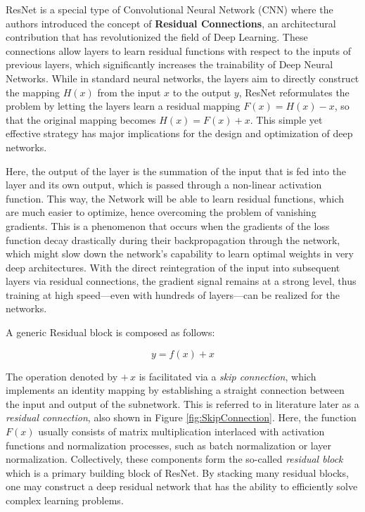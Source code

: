 ResNet \cite{ResNet} is a special type of Convolutional Neural Network (CNN) where the authors introduced the concept of \textbf{Residual Connections}, an architectural contribution that has revolutionized the field of Deep Learning. These connections allow layers to learn residual functions with respect to the inputs of previous layers, which significantly increases the trainability of Deep Neural Networks.
While in standard neural networks, the layers aim to directly construct the mapping $H(x)$ from the input $x$ to the output $y$, ResNet reformulates the problem by letting the layers learn a residual mapping $F(x) = H(x) - x$, so that the original mapping becomes $H(x) = F(x) + x$. This simple yet effective strategy has major implications for the design and optimization of deep networks.

Here, the output of the layer is the summation of the input that is fed into the layer and its own output, which is passed through a non-linear activation function. This way, the Network will be able to learn residual functions, which are much easier to optimize, hence overcoming the problem of vanishing gradients.
This is a phenomenon that occurs when the gradients of the loss function decay drastically during their backpropagation through the network, which might slow down the network's capability to learn optimal weights in very deep architectures. With the direct reintegration of the input into subsequent layers via residual connections, the gradient signal remains at a strong level, thus training at high speed—even with hundreds of layers—can be realized for the networks.

A generic Residual block is composed as follows:
\begin{center} 
    \[
        y = f(x) + x
    \]
\end{center}

The operation denoted by $+ \, x$ is facilitated via a \textit{skip connection}, which implements an identity mapping by establishing a straight connection between the input and output of the subnetwork. This is referred to in literature later as a \textit{residual connection}, also shown in Figure \ref{fig:SkipConnection}. Here, the function $F(x)$ usually consists of matrix multiplication interlaced with activation functions and normalization processes, such as batch normalization or layer normalization. Collectively, these components form the so-called \textit{residual block} which is a primary building block of ResNet. By stacking many residual blocks, one may construct a deep residual network that has the ability to efficiently solve complex learning problems.

